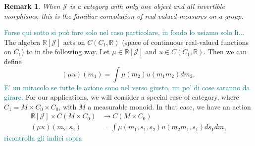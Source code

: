 \documentclass[12pt]{article}
\newtheorem{remark}{Remark}
\newcommand{\pietro}[1]{\textcolor{teal}{#1}}
\newcommand{\R}{{\mathbb{R}}}
\newcommand{\JCat}{{\mathcal{J}}}
\begin{document}
\begin{remark}
    When $\JCat$ is a category with only one object and all invertible morphisms, this is the familiar convolution of real-valued measures on a group.
\end{remark}

\pietro{Forse qui sotto si può fare solo nel caso particolare, in fondo lo usiamo solo lì...}
The algebra $\R[\JCat]$ acts on $C(C_1, \R)$ (space of continuous real-valued functions on $C_1$) to in the following way. Let $\mu \in \R[\JCat]$ and $u \in C(C_1, \R)$. Then we can define
\begin{equation*}
    (\mu u)(m_1) = \int \mu(m_2) u(m_1m_2) dm_2,
\end{equation*}
\pietro{E' un miracolo se tutte le azione sono nel verso giusto, un po' di cose saranno da girare.}
For our applications, we will consider a special case of category, where $C_1 = M \times C_0 \times C_0$, with $M$ a measurable monoid. In that case, we have an action
\begin{align*}
    \R[\JCat] \times C(M \times C_0) &\rightarrow C(M \times C_0)\\
    (\mu u)(m_2, s_2) &= \int \mu(m_1, s_1, s_2) u(m_2m_1, s_1) ds_1dm_1
\end{align*}
\pietro{ricontrolla gli indici sopra}


\end{document}
